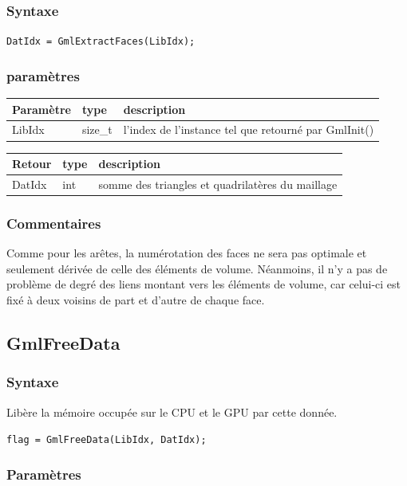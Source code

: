 \documentclass[a4paper,12pt]{article}
\begin{document}
\subsubsection*{Syntaxe}

{\tt DatIdx = GmlExtractFaces(LibIdx);}

\subsubsection*{paramètres}

\begin{tabular}{|m{2cm}|m{1.5cm}|m{10.5cm}|}
\hline
Paramètre  & type    & description \\
\hline
LibIdx     & size\_t & l'index de l'instance tel que retourné par GmlInit() \\
\hline
\end{tabular}

\medskip

\begin{tabular}{|m{2cm}|m{1.5cm}|m{10.5cm}|}
\hline
Retour     & type   & description \\
\hline
DatIdx     & int    & somme des triangles et quadrilatères du maillage \\
\hline
\end{tabular}

\subsubsection*{Commentaires}
Comme pour les arêtes, la numérotation des faces ne sera pas optimale et seulement dérivée de celle des éléments de volume.
Néanmoins, il n'y a pas de problème de degré des liens montant vers les éléments de volume, car celui-ci est fixé à deux voisins de part et d'autre de chaque face.


\subsection{GmlFreeData}

\subsubsection*{Syntaxe}

Libère la mémoire occupée sur le CPU et le GPU par cette donnée.

{\tt flag = GmlFreeData(LibIdx, DatIdx);}

\subsubsection*{Paramètres}
\end{document}

